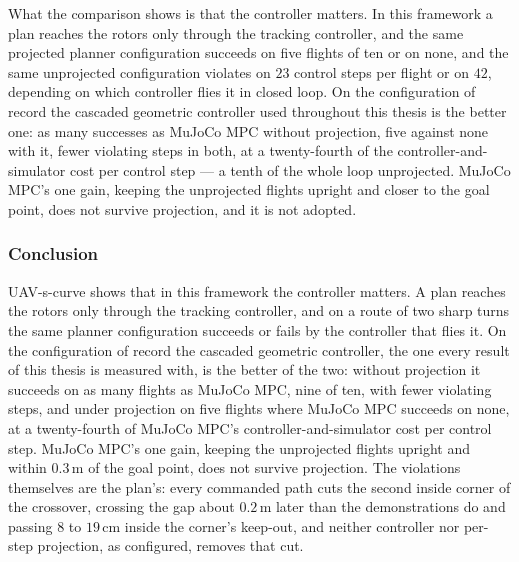 What the comparison shows is that the controller matters. In this framework a plan reaches the rotors only
through the tracking controller, and the same projected planner configuration succeeds on five flights of ten or on none, and
the same unprojected configuration violates on $23$ control steps per flight or on $42$, depending on which
controller flies it in closed loop. On the configuration of record the cascaded geometric controller used throughout this thesis is
the better one: as many successes as MuJoCo MPC without projection, five against none with it, fewer violating
steps in both, at a twenty-fourth of the controller-and-simulator cost per control step --- a tenth of the whole loop
unprojected. MuJoCo MPC's one gain, keeping the unprojected
flights upright and closer to the goal point, does not survive projection, and it is not adopted.

\FloatBarrier
\subsubsection{Conclusion}\label{sec:res:uav:scurve:conclusion}

UAV-s-curve shows that in this framework the controller matters. A plan reaches the rotors only through the
tracking controller, and on a route of two sharp turns the same planner configuration succeeds or fails by the controller that
flies it. On the configuration of record the cascaded geometric controller, the one every result of this
thesis is measured with, is the better of the two: without projection it succeeds on as many flights as
MuJoCo MPC, nine of ten, with fewer violating steps, and under projection on five flights where MuJoCo MPC
succeeds on none, at a twenty-fourth of MuJoCo MPC's controller-and-simulator cost per control step. MuJoCo MPC's one gain,
keeping
the unprojected flights upright and within $0.3$\,m of the goal point, does not survive projection. The
violations themselves are the plan's: every commanded path cuts the second inside corner of the crossover,
crossing the gap about $0.2$\,m later than the demonstrations do and passing $8$ to $19$\,cm inside the
corner's keep-out, and neither controller nor per-step projection, as configured, removes that cut.

